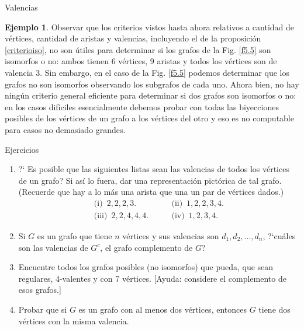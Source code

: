 \documentclass[11pt,spanish,makeidx]{amsbook}
\theoremstyle{definition}
\newtheorem{ejemplo}{Ejemplo}[section]
\theoremstyle{remark}
\begin{document}
\begin{section}{Valencias}
\begin{ejemplo}
Observar que los criterios vistos hasta ahora relativos a cantidad de vértices,  cantidad de aristas y valencias, incluyendo el de la proposición \ref{criterioiso}, no son útiles para determinar si los grafos de  la Fig. \ref{f5.5} son isomorfos o no: ambos tienen 6 vértices, 9 aristas y todos los vértices son de valencia 3. Sin embargo, en el caso de la Fig. \ref{f5.5} podemos determinar que los grafos no son isomorfos observando los subgrafos de cada uno. Ahora bien, no  hay ningún criterio general eficiente para determinar si dos grafos son isomorfos o no: en los casos difíciles esencialmente debemos probar con todas las biyecciones posibles de los vértices de un grafo a los vértices del otro y eso es no computable para casos no demasiado  grandes.   
  
 
\end{ejemplo}

\begin{subsection}{Ejercicios}\label{ejercicios5.3}
\begin{enumerate}
\item ?` Es posible que las siguientes listas sean las valencias de todos los vértices de un
grafo? Si así lo fuera, dar una representación pictórica de tal
grafo. (Recuerde que hay a lo más una arista que una un par de
vértices dados.)
$$
\begin{aligned}
\text{(i)} \,\,\, 2,2,2,3. \qquad &\text{(ii)} \,\,\, 1,2,2,3,4. \\
\text{(iii)} \,\,\,2,2,4,4,4. \qquad &\text{(iv)} \,\,\, 1,2,3,4.
\end{aligned}
$$
\item  Si $G$ es un grafo que tiene $n$ vértices y sus valencias son $d_1,d_2,\ldots,d_n$, ?`cuáles son las valencias de $G^c$, el grafo complemento de $G$?
\item Encuentre todos los grafos posibles (no isomorfos) que pueda, que sean regulares, 4-valentes y con 7 vértices. [Ayuda: considere el complemento de esos grafos.]
\item Probar que si $G$ es un grafo con al menos dos vértices, entonces $G$ tiene dos vértices con la misma valencia.
\end{enumerate}

\end{subsection}

\end{section}
\end{document}
